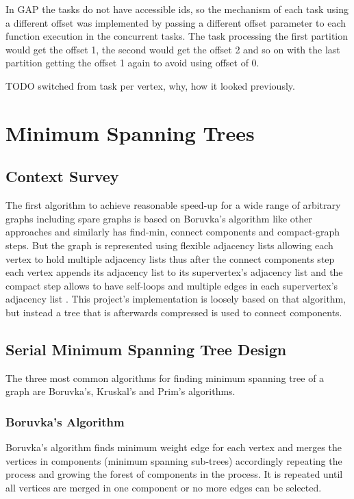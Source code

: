 \documentclass{report}
\theoremstyle{plain}
\theoremstyle{definition}
\theoremstyle{remark}
\begin{document}
In GAP the tasks do not have accessible ids, so the mechanism of each task using a different offset was implemented by passing a different offset parameter to each function execution in the concurrent tasks. The task processing the first partition would get the offset 1, the second would get the offset 2 and so on with the last partition getting the offset 1 again to avoid using offset of 0.

TODO switched from task per vertex, why, how it looked previously.

\chapter{Minimum Spanning Trees}

\section{Context Survey}
The first algorithm to achieve reasonable speed-up for a wide range of arbitrary graphs including spare graphs is based on Boruvka's algorithm like other approaches and similarly has find-min, connect components and compact-graph steps. But the graph is represented using flexible adjacency lists allowing each vertex to hold multiple adjacency lists thus after the connect components step each vertex appends its adjacency list to its supervertex's adjacency list and the compact step allows to have self-loops and multiple edges in each supervertex's adjacency list \cite{Bader20061366}. This project's implementation is loosely based on that algorithm, but instead a tree that is afterwards compressed is used to connect components.

\section{Serial Minimum Spanning Tree Design}

The three most common algorithms for finding minimum spanning tree of a graph are Boruvka's, Kruskal's and Prim's algorithms.

\subsection*{Boruvka's Algorithm}

Boruvka's algorithm finds minimum weight edge for each vertex and merges the vertices in components (minimum spanning sub-trees) accordingly repeating the process and growing the forest of components in the process. It is repeated until all vertices are merged in one component or no more edges can be selected.
\end{document}
